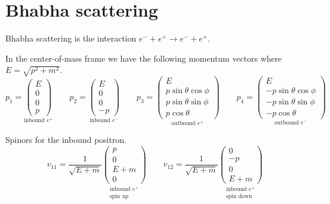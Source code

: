 

\section*{Bhabha scattering}

Bhabha scattering is the interaction $e^-+e^+\rightarrow e^-+e^+$.
%
\begin{center}
\end{center}
%
In the center-of-mass frame we have the following momentum vectors where $E=\sqrt{p^2+m^2}$.
\begin{equation*}
p_1=\underset{\text{inbound $e^+$}}
{\begin{pmatrix}E\\0\\0\\p\end{pmatrix}}
\qquad
p_2=\underset{\text{inbound $e^-$}}
{\begin{pmatrix}E\\0\\0\\-p\end{pmatrix}}
\qquad
p_3=\underset{\text{outbound $e^+$}}
{\begin{pmatrix}E\\p\sin\theta\cos\phi\\p\sin\theta\sin\phi\\p\cos\theta\end{pmatrix}}
\qquad
p_4=\underset{\text{outbound $e^-$}}
{\begin{pmatrix}E\\-p\sin\theta\cos\phi\\-p\sin\theta\sin\phi\\-p\cos\theta\end{pmatrix}}
\end{equation*}

Spinors for the inbound positron.
\begin{equation*}
v_{11}=\frac{1}{\sqrt{E+m}}
\underset{\substack{\text{inbound $e^+$}\\ \text{spin up}}}
{\begin{pmatrix}p\\0\\E+m\\0\end{pmatrix}}
\qquad
v_{12}=\frac{1}{\sqrt{E+m}}
\underset{\substack{\text{inbound $e^+$}\\ \text{spin down}}}
{\begin{pmatrix}0\\-p\\0\\E+m\end{pmatrix}}
\end{equation*}

